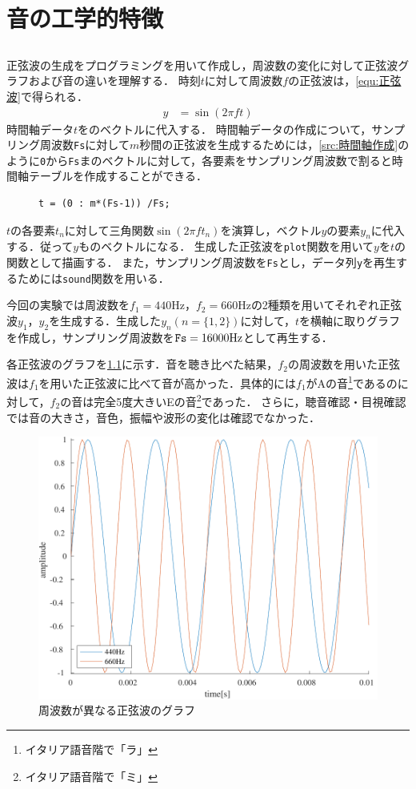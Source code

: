 \chapter{音の工学的特徴}\label{chap:音の工学的特徴}
\section{\kadaiaa}\label{sec:\kadaiaa}
\purpose 正弦波の生成をプログラミングを用いて作成し，周波数の変化に対して正弦波グラフおよび音の違いを理解する．
\method 時刻\(t\)に対して周波数\(f\)の正弦波は，\eqref{equ:正弦波}で得られる．
\begin{align}
    y & =\sin(2\pi ft)\label{equ:正弦波}
\end{align}
時間軸データ\(t\)をのベクトルに代入する．
時間軸データの作成について，サンプリング周波数\texttt{Fs}に対して\(m\)秒間の正弦波を生成するためには，\ref{src:時間軸作成}のように\texttt{0}から\texttt{Fs}まのベクトルに対して，各要素をサンプリング周波数で割ると時間軸テーブルを作成することができる．\par
\begin{figure}
    \begin{lstlisting}[caption={時間軸作成},numbers={none},label={src:時間軸作成}]
t = (0 : m*(Fs-1)) /Fs;
\end{lstlisting}
\end{figure}
\(t\)の各要素\(t_n\)に対して三角関数\(\sin(2\pi ft_n)\)を演算し，ベクトル\(y\)の要素\(y_n\)に代入する．従って\(y\)ものベクトルになる．
生成した正弦波を\texttt{plot}関数を用いて\(y\)を\(t\)の関数として描画する．
また，サンプリング周波数を\texttt{Fs}とし，データ列\texttt{y}を再生するためには\texttt{sound}関数を用いる．\par
今回の実験では周波数を\(f_1=440\textrm{Hz}\)，\(f_2=660\textrm{Hz}\)の2種類を用いてそれぞれ正弦波\(y_1\)，\(y_2\)を生成する．生成した\(y_n(n=\{1,2\})\)に対して，\(t\)を横軸に取りグラフを作成し，サンプリング周波数を\(\textrm{\texttt{Fs}}=16000\textrm{Hz}\)として再生する．\par
{}
\result 各正弦波のグラフを\ref{fig:\kadaiaa}に示す．音を聴き比べた結果，\(f_2\)の周波数を用いた正弦波は\(f_1\)を用いた正弦波に比べて音が高かった．具体的には\(f_1\)がAの音\footnote{イタリア語音階で「ラ」}であるのに対して，\(f_2\)の音は完全5度大きいEの音\footnote{イタリア語音階で「ミ」}であった．
さらに，聴音確認・目視確認では音の大きさ，音色，振幅や波形の変化は確認でなかった．\par
\begin{figure}
    \caption{周波数が異なる正弦波のグラフ}
    \label{fig:\kadaiaa}
    \includegraphics[keepaspectratio,width=.3\textwidth]{../../Figures/01_01.pdf}
\end{figure}
